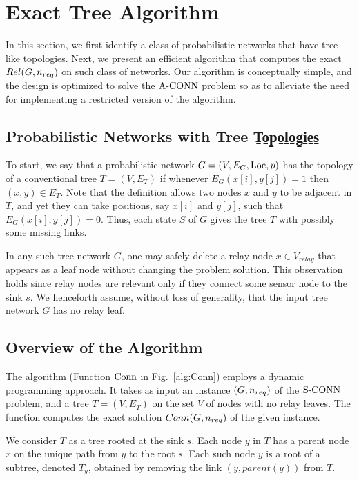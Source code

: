
\section{Exact Tree Algorithm}

In this section, we first identify a class of probabilistic networks
that have tree-like topologies.
%
Next, we present an efficient algorithm that computes the exact
$Rel(G,{n_{req}})$ on such class of networks.
%
Our algorithm is conceptually simple, and the design is optimized to
solve the ${\mathrm {A\mbox{-}CONN}}$ problem so as to alleviate the need for implementing
a restricted version of the algorithm.

\subsection{Probabilistic Networks with Tree T̠o̠p̠o̠l̠o̠g̠i̠e̠s̠}

To start, we say that a probabilistic network $G=(V,E_G,{\mathrm {Loc}},p)$ has
the topology of a conventional tree $T=(V,E_T)$ if whenever $E_G(x[i],y[j])= 1$
then $(x,y) \in E_T$.
%
Note that the definition allows two nodes $x$ and $y$ to be adjacent in
$T$, and yet they can take positions, say $x[i]$ and $y[j]$, such that
$E_G (x[i],y[j])= 0$.
%
Thus, each state $S$ of $G$ gives the tree $T$ with possibly some missing
links.

\nwline
In any such tree network $G$, one may safely delete a relay node
$x \in V_{relay}$ that appears as a leaf node without changing the problem
solution. 
%
This observation holds since relay nodes are relevant only if they
connect some sensor node to the sink $s$.
%
We henceforth assume, without loss of generality, that the input tree
network $G$ has no relay leaf.

\subsection{Overview of the Algorithm}

The algorithm (Function ${\mathrm {Conn}}$ in Fig.~\ref{alg:Conn}) employs a
dynamic programming approach.
%
It takes as input an instance $(G,{n_{req}})$ of the ${\mathrm {S\mbox{-}CONN}}$ problem,
and a tree $T=(V,E_T)$ on the set $V$ of nodes with no relay leaves.
%
The function computes the exact solution $Conn(G,{n_{req}})$ of the given
instance.

We consider $T$ as a tree rooted at the sink $s$. Each node $y$ in $T$
has a parent node $x$ on the unique path from $y$ to the root $s$.
%
Each such node $y$ is a root of a subtree, denoted $T_y$, obtained by
removing the link $(y, parent(y))$ from $T$.


